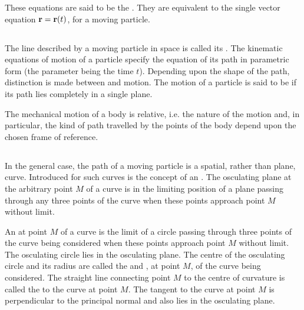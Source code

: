 These equations are said to be the . They are equivalent to the single vector equation
$\vb{r} = \vb{r} (t)$, for a moving particle.

\subsection{}\label{1.2.3} The line described by a moving particle in space is called its . The kinematic equations of motion of a particle spec­ify the equation of its path in parametric form (the parameter being the time $t$). Depending upon the shape of the path, distinction is made between  and  motion. The motion of a particle is said to be  if its path lies com­pletely in a single plane.

The mechanical motion of a body is relative, i.e. the nature of the motion and, in particular, the kind of path travelled by the points of the body depend upon the chosen frame of re­ference.

\subsection{}\label{1.2.4} In the general case, the path of a moving particle is a spatial, rather than plane, curve. Introduced for such curves is the concept of an . The osculating plane at the arbitrary point $M$ of a curve is in the limiting position of a plane passing through any three points of the curve when these points approach point $M$ without limit.

An  at point $M$ of a curve is the limit of a circle passing through three points of the curve being considered when these points approach po­int $M$ without limit. The oscu­lating circle lies in the oscula­ting plane. The centre of the osculating circle and its radius are called the  and , at point $M$, of the curve being considered. The straight line connecting point $M$ to the centre of curvature is called the  to the curve at point $M$. The tan­gent to the curve at point $M$ is perpendicular to the principal normal and also lies in the osculating plane.

